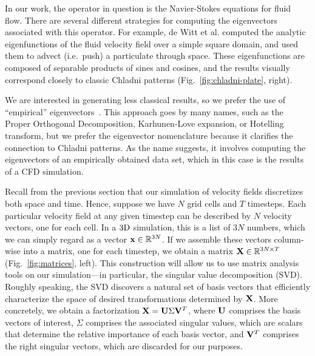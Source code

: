 \documentclass[11pt]{article}
\begin{document}
In our work, the operator in question is the Navier-Stokes equations for fluid flow. There are several different strategies for computing the eigenvectors associated with this operator. For example, de Witt et al. \cite{deWitt:2012} computed the analytic eigenfunctions of the fluid velocity field over a simple square domain, and used them to advect (i.e.~push) a particulate through space. These eigenfunctions are composed of separable products of sines and cosines, and the results visually correspond closely to classic Chladni patterns (Fig.~\ref{fig:chladni-plate}, right).

We are interested in generating less classical results, so we prefer the use of ``empirical'' eigenvectors~\cite{Ryckelynck2005}. This approach goes by many names, such as the Proper Orthogonal Decomposition, Karhunen-Love expansion, or Hotelling transform, but we prefer the eigenvector nomenclature because it clarifies the connection to Chladni patterns. As the name suggests, it involves computing the eigenvectors of an empirically obtained data set, which in this case is the results of a CFD simulation.

Recall from the previous section that our simulation of velocity fields discretizes both space and time. Hence, suppose we have $N$ grid cells and $T$ timesteps. Each particular velocity field at any given timestep can be described by $N$ velocity vectors, one for each cell. In a $3\textnormal{D}$ simulation, this is a list of $3N$ numbers, which we can simply regard as a vector $\mathbf{x} \in \mathbb{R}^{3N}$. If we assemble these vectors column-wise into a matrix, one for each timestep, we obtain a matrix $\mathbf{X} \in \mathbb{R}^{3N \times T}$ (Fig.~\ref{fig:matrices}, left). This construction will allow us to use matrix analysis tools on our simulation---in particular, the singular value decomposition (SVD). Roughly speaking, the SVD discovers a natural set of basis vectors that efficiently characterize the space of desired transformations determined by $\mathbf{X}$. More concretely, we obtain a factorization $\mathbf{X} = \mathbf{U} \Sigma \mathbf{V}^T$, where $\mathbf{U}$ comprises the basis vectors of interest, $\Sigma$ comprises the associated singular values, which are scalars that determine the relative importance of each basis vector, and $\mathbf{V}^T$ comprises the right singular vectors, which are discarded for our purposes.
\end{document}
